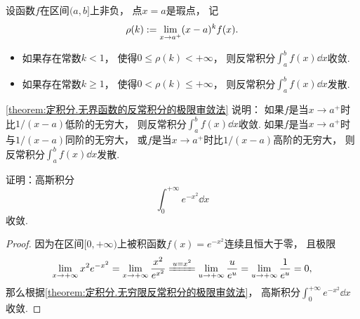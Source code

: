 \begin{theorem}[极限审敛法2]\label{theorem:定积分.无界函数的反常积分的极限审敛法}
设函数\(f\)在区间\((a,b]\)上非负，
点\(x=a\)是瑕点，
记\[
	\rho(k) := \lim_{x\to a^+} (x-a)^k f(x).
\]
\begin{itemize}
	\item 如果存在常数\(k < 1\)，
	使得\(0 \leq \rho(k) < +\infty\)，
	则反常积分\(\int_a^b f(x) \dd{x}\)收敛.

	\item 如果存在常数\(k \geq 1\)，
	使得\(0 < \rho(k) \leq +\infty\)，
	则反常积分\(\int_a^b f(x) \dd{x}\)发散.
\end{itemize}
\end{theorem}
\begin{remark}
\cref{theorem:定积分.无界函数的反常积分的极限审敛法} 说明：
如果\(f\)是当\(x \to a^+\)时比\(1/(x-a)\)低阶的无穷大，
则反常积分\(\int_a^b f(x) \dd{x}\)收敛.
如果\(f\)是当\(x \to a^+\)时与\(1/(x-a)\)同阶的无穷大，
或\(f\)是当\(x \to a^+\)时比\(1/(x-a)\)高阶的无穷大，
则反常积分\(\int_a^b f(x) \dd{x}\)发散.
\end{remark}

\begin{example}\label{example:定积分.高斯积分的收敛性}
证明：高斯积分\[
	\int_0^{+\infty} e^{-x^2} \dd{x}
\]收敛.
\begin{proof}
因为在区间\([0,+\infty)\)上被积函数\(f(x) = e^{-x^2}\)连续且恒大于零，
且极限\[
	\lim_{x\to+\infty} x^2 e^{-x^2}
	= \lim_{x\to+\infty} \frac{x^2}{e^{x^2}}
	\xlongequal{u=x^2} \lim_{u\to+\infty} \frac{u}{e^u}
	= \lim_{u\to+\infty} \frac{1}{e^u}
	= 0,
\]
那么根据\cref{theorem:定积分.无穷限反常积分的极限审敛法}，
高斯积分\(\int_0^{+\infty} e^{-x^2} \dd{x}\)收敛.
\end{proof}
\end{example}

